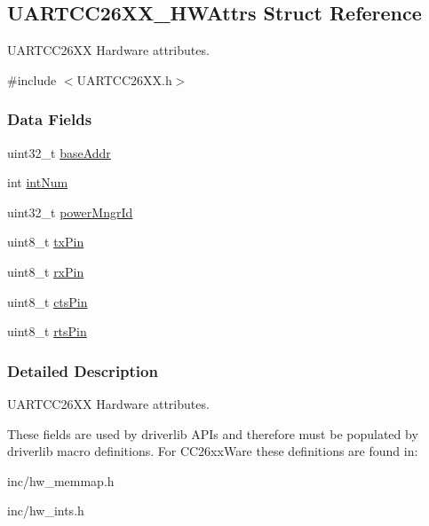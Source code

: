 \subsection{U\+A\+R\+T\+C\+C26\+X\+X\+\_\+\+H\+W\+Attrs Struct Reference}
\label{struct_u_a_r_t_c_c26_x_x___h_w_attrs}


U\+A\+R\+T\+C\+C26\+X\+X Hardware attributes.  




{\ttfamily \#include $<$U\+A\+R\+T\+C\+C26\+X\+X.\+h$>$}

\subsubsection*{Data Fields}
\begin{DoxyCompactItemize}
\item 
uint32\+\_\+t \hyperlink{struct_u_a_r_t_c_c26_x_x___h_w_attrs_aa7747b4d98279e8cad825a56df846af7}{base\+Addr}
\item 
int \hyperlink{struct_u_a_r_t_c_c26_x_x___h_w_attrs_ab16717e96a640f0908f868e48624d3dd}{int\+Num}
\item 
uint32\+\_\+t \hyperlink{struct_u_a_r_t_c_c26_x_x___h_w_attrs_a4b66ad587cd8c36b48b7cabc166e3c92}{power\+Mngr\+Id}
\item 
uint8\+\_\+t \hyperlink{struct_u_a_r_t_c_c26_x_x___h_w_attrs_abe8dcea54ebbdebdaae1504908a96b95}{tx\+Pin}
\item 
uint8\+\_\+t \hyperlink{struct_u_a_r_t_c_c26_x_x___h_w_attrs_a45fd697b8735c682ce7d12af6348d229}{rx\+Pin}
\item 
uint8\+\_\+t \hyperlink{struct_u_a_r_t_c_c26_x_x___h_w_attrs_a03d0531a1fdcf84206163376c6eefaba}{cts\+Pin}
\item 
uint8\+\_\+t \hyperlink{struct_u_a_r_t_c_c26_x_x___h_w_attrs_a1a9efb86deefbf00c440787513fc8d96}{rts\+Pin}
\end{DoxyCompactItemize}


\subsubsection{Detailed Description}
U\+A\+R\+T\+C\+C26\+X\+X Hardware attributes. 

These fields are used by driverlib A\+P\+Is and therefore must be populated by driverlib macro definitions. For C\+C26xx\+Ware these definitions are found in\+:
\begin{DoxyItemize}
\item inc/hw\+\_\+memmap.\+h
\item inc/hw\+\_\+ints.\+h
\end{DoxyItemize}

